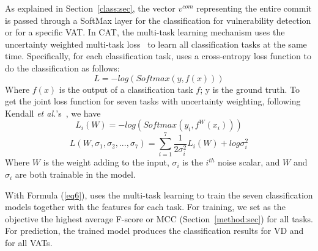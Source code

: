 As explained in Section~\ref{class:sec}, the vector $v^{com}$
representing the entire commit is passed through a SoftMax layer for
the classification for vulnerability detection or for a specific VAT.
In CAT, the multi-task learning mechanism uses the uncertainty
weighted multi-task loss~\cite{kendall2018multi} to learn all 
classification tasks at the same time. Specifically, for each
classification task, \tool uses a cross-entropy loss function to do
the classification as follows:
\begin{equation}\label{eq4}
	L = -log(Softmax(y, f(x)))
\end{equation}
Where $f(x)$ is the output of a classification task $f$; y is the
ground truth. To get the joint loss function for seven tasks with
uncertainty weighting, following Kendall {\em et
  al.}'s~\cite{kendall2018multi}, we have
\begin{equation}\label{eq5}
	L_i(W) = -log(Softmax(y_i, f^W(x_i)))
\end{equation}
\begin{equation}\label{eq6}
	L(W, \sigma_1, \sigma_2, ..., \sigma_7) = \sum_{i=1}^7\frac{1}{2\sigma_i^2}L_i(W) + log \sigma^2_i
\end{equation}
Where $W$ is the weight adding to the input, $\sigma_i$ is the
$i^{th}$ noise scalar, and $W$ and $\sigma_i$ are both trainable in
the model.

With Formula (\ref{eq6}), {\tool} uses the multi-task
learning to train the seven classification models together with the
features for each task. For training, we set as the objective the
highest average F-score or MCC (Section~\ref{method:sec}) for all
tasks. For prediction, the trained model produces the
classification results for VD and for all VATs.



